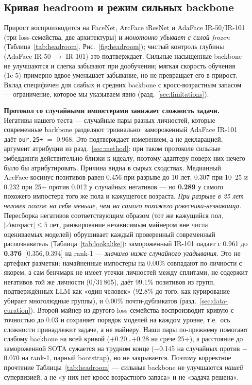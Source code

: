 \documentclass[journal]{IEEEtran}
\begin{document}
\subsection{Кривая headroom и режим сильных backbone}\label{sec:res-headroom}
Прирост воспроизводится на FaceNet, ArcFace iResNet и AdaFace IR-50/IR-101 (три loss-семейства, две архитектуры) и \emph{монотонно убывает с силой frozen} (Таблица~\ref{tab:headroom}, Рис.~\ref{fig:headroom}); чистый контроль глубины (AdaFace IR-50 $\rightarrow$ IR-101) это подтверждает. Сильные насыщенные backbone не улучшаются и слегка забывают при дообучении; мягкая скорость обучения (1e-5) примерно вдвое уменьшает забывание, но не превращает его в прирост. Вклад специфичен для слабых и средних backbone с кросс-возрастным запасом --- ограничение, которое мы указываем явно (разд.~\ref{sec:limitations}).

\textbf{Протокол со случайными импостерами занижает сложность задачи.} Негативы нашего теста --- случайные пары разных личностей, которые современные backbone разделяют тривиально: замороженный AdaFace IR-101 даёт \texttt{our.25+} $=$ 0.968. Это подтверждает измерением, а не декларацией, аргумент атрибуции из разд.~\ref{sec:method}: при таком протоколе сильные эмбеддинги действительно близки к идеалу, поэтому адаптеру поверх них нечего было бы атрибутировать. Причина видна в сырых сходствах. Медианный ArcFace-косинус позитивов равен 0.456 при разрыве до 10 лет, 0.307 при 10--25 и 0.232 при 25$+$ против 0.012 у случайных негативов --- но \textbf{0.289} у самого похожего импостера того же пола и кажущегося возраста. \emph{При разрыве в 25 лет человек похож на себя меньше, чем на самого похожего ровесника-незнакомца.} Пересборка негативов соответствующим образом (тот же кажущийся пол, $|\Delta\text{возраст}|\leq5$ лет, ранжирование независимым майнером вне числа оцениваемых моделей) обрушивает каждый проверенный современный распознаватель (Таблица~\ref{tab:lookalike}): замороженный IR-101 падает с 0.961 до \textbf{0.376}~[0.356,\,0.394] на rank-1 --- \emph{значимо ниже случайного угадывания}. Это не артефакт разметки: намайненные импостеры на 0.00\% совпадают по личности с якорем, а сам бенчмарк не имеет утечки личностей между сплитами, не содержит негативов той же личности (0/31\,865), даёт 99.1\% позитивов из групп, подтверждённых LLM как «один человек» (92.8\% до того, как курирование убирает многолюдные группы), и 0.00\% почти-дубликатов (разд.~\ref{sec:data-curation}). Второй майнер из другого loss-семейства воспроизводит кривую с точностью до 0.03 и сохраняет порядок моделей на каждом уровне, т.е.\ ось сложности принадлежит задаче, а не майнеру. Наши пары по-прежнему помогают слабому backbone на всей кривой ($+$0.20…$+$0.28 на срезе 25$+$), а расстояние до замороженной SOTA сужается на трудном конце ($-$0.145 на случайных против $-$0.070 на rank-1, парный bootstrap), но не закрывается. Поэтому корректное прочтение Таблицы~\ref{tab:headroom} --- сильные backbone не улучшаются \emph{нашей} супервизией, а не «у них нет кросс-возрастного запаса» и не «задача решена».
\end{document}

